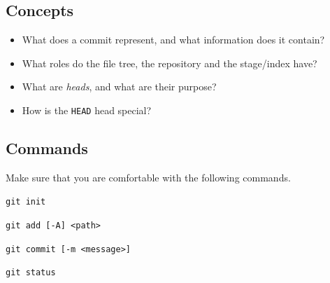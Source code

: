 \documentclass[../main/git_course_main.tex]{subfiles}
\begin{document}
\subsection{Concepts}

\begin{itemize}
\item What does a commit represent, and what information does it contain?
\item What roles do the file tree, the repository and the stage/index have?
\item What are \textit{heads}, and what are their purpose?
\item How is the \verb$HEAD$ head special?
\end{itemize}

\subsection{Commands}

Make sure that you are comfortable with the following commands.

\begin{description}
	\item \verb$git init$
	\item \verb$git add [-A] <path>$
	\item \verb$git commit [-m <message>]$
	\item \verb$git status$
\end{description}
\end{document}
